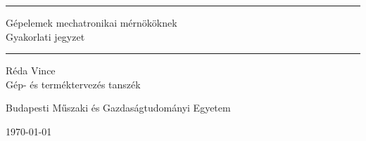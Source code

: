\begin{titlepage}
\begin{center}


\vspace*{1cm}

{\hrule height 1pt}
\vspace{2mm}
\Huge
Gépelemek mechatronikai mérnököknek\\
\Large
Gyakorlati jegyzet\\
\vspace{8mm}
{\hrule height 1pt}

\vspace{2cm}

Réda Vince\\

\vfill
\large
Gép- és terméktervezés tanszék

Budapesti Műszaki és Gazdaságtudományi Egyetem

\today

\end{center}
\end{titlepage}
